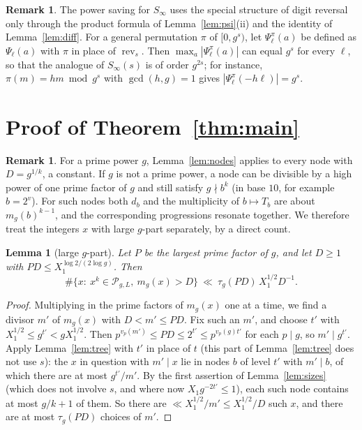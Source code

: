\documentclass[11pt]{amsart}
\newtheorem{lemma}[theorem]{Lemma}
\theoremstyle{definition}
\newtheorem{remark}[theorem]{Remark}
\numberwithin{equation}{section}
\newcommand{\cP}{\mathcal{P}}
\newcommand{\rev}{\operatorname{rev}}
\newcommand{\Sinf}{S_\infty}
\begin{document}
\begin{remark}
The power saving for $\Sinf$ uses the special structure of digit reversal
only through the product formula of Lemma~\ref{lem:psi}(ii) and the
identity of Lemma~\ref{lem:diff}. For a general permutation $\pi$ of
$[0,g^s)$, let $\Psi^\pi_\ell(a)$ be defined as $\Psi_\ell(a)$ with $\pi$
in place of $\rev_s$. Then $\max_a|\Psi^\pi_\ell(a)|$ can equal $g^s$ for
every $\ell$, so that the analogue of $\Sinf(s)$ is of order $g^{2s}$; for
instance, $\pi(m)=hm\bmod g^s$ with $\gcd(h,g)=1$ gives
$|\Psi^\pi_\ell(-h\ell)|=g^s$.
\end{remark}

\section{Proof of \texorpdfstring{Theorem~\ref{thm:main}}{Theorem 1.1}}\label{sec:proof}

\begin{remark}\label{rem:whycomposite}
For a prime power $g$, Lemma~\ref{lem:nodes} applies to every node with
$D=g^{1/k}$, a constant. If $g$ is not a prime power, a node can be divisible by a
high power of one prime factor of $g$ and still satisfy $g\nmid b^k$ (in
base $10$, for example $b=2^v$). For such nodes both $d_b$ and the
multiplicity of $b\mapsto T_b$ are about $m_g(b)^{k-1}$, and the
corresponding progressions resonate together. We therefore treat the
integers $x$ with large $g$-part separately, by a direct count.
\end{remark}

\begin{lemma}[large $g$-part]\label{lem:large}
Let $P$ be the largest prime factor of $g$, and let $D\ge1$ with
$PD\le X_1^{\log2/(2\log g)}$. Then
\[
\#\{x:\ x^k\in\cP_{g,L},\ m_g(x)>D\}\ \ll\ \tau_g(PD)\,X_1^{1/2}D^{-1}.
\]
\end{lemma}

\begin{proof}
Multiplying in the prime factors of $m_g(x)$ one at a time, we find a
divisor $m'$ of $m_g(x)$ with $D<m'\le PD$. Fix such an $m'$, and choose $t'$
with $X_1^{1/2}\le g^{t'}<gX_1^{1/2}$. Then
$p^{v_p(m')}\le PD\le2^{t'}\le p^{v_p(g)t'}$ for each $p\mid g$, so
$m'\mid g^{t'}$. Apply Lemma~\ref{lem:tree} with $t'$ in place of $t$ (this
part of Lemma~\ref{lem:tree} does not use $s$): the $x$ in question with
$m'\mid x$ lie in nodes $b$ of level $t'$ with $m'\mid b$, of which there are at
most $g^{t'}/m'$. By the first assertion of Lemma~\ref{lem:sizes} (which
does not involve $s$, and where now $X_1g^{-2t'}\le1$), each such node
contains at most $g/k+1$ of them. So there are $\ll X_1^{1/2}/m'\le
X_1^{1/2}/D$ such $x$, and there are at most $\tau_g(PD)$ choices of $m'$.
\end{proof}
\end{document}
